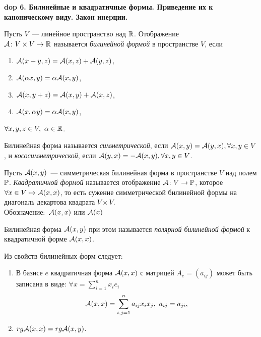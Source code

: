 \textbf{\LARGE dop 6. Билинейные и квадpатичные фоpмы. Пpиведение их к каноническому виду. Закон инеpции.}


\begin{definition}
Пусть $V$~--- линейное пространство над ${\mathbb{R}}$. Отображение\\ ${\mathcal{A}}\colon V\times V\to {\mathbb{R}}$ называется \emph{билинейной формой} в пространстве $V$, если
\begin{enumerate}
    \item ${\mathcal{A}}(x+y,z)={\mathcal{A}}(x,z)+{\mathcal{A}}(y,z)$,
    \item ${\mathcal{A}}(\alpha x,y)=\alpha{\mathcal{A}}(x,y)$,
    \item ${\mathcal{A}}(x,y+z)={\mathcal{A}}(x,y)+{\mathcal{A}}(x,z)$,
    \item ${\mathcal{A}}(x,\alpha y)=\alpha{\mathcal{A}}(x,y)$,
\end{enumerate}
$\forall x,y,z\in V,~\alpha\in{\mathbb{R}}$.
\end{definition}

\begin{definition}
Билинейная форма называется \emph{симметрической}, если ${\mathcal{A}}(x,y)={\mathcal{A}}(y,x),\forall x,y\in V$, и \emph{кососимметрической}, если ${\mathcal{A}}(y,x)=-{\mathcal{A}}(x,y),\forall x,y\in V$.
\end{definition}

\begin{definition}
Пусть ${\mathcal{A}}(x,y)$~--- симметрическая билинейная форма в пространстве $V$ над полем ${\mathbb{P}}$. \emph{Квадратичной формой} называется отображение ${\mathcal{A}}\colon V\to{\mathbb{P}}$, которое $\forall x\in V\mapsto {\mathcal{A}}(x,x)$, то есть сужение симметрической билинейной формы на диагональ декартова квадрата $V\times V$.\\
\textsf{Обозначение:}~${\mathcal{A}}(x,x)$ или ${\mathcal{A}}(x)$
\end{definition}

\begin{definition}
Билинейная форма ${\mathcal{A}}(x,y)$ при этом называется \emph{полярной билинейной формой} к квадратичной форме ${\mathcal{A}}(x,x)$.
\end{definition}

\begin{Commentwhite}
Из свойств билинейных форм следует:
\begin{enumerate}
    \item В базисе $e$ квадратичная форма ${\mathcal{A}}(x,x)$ с матрицей $A_e=(a_{ij})$ может быть записана в виде: $\forall x=\sum_{i=1}^nx_ie_i$
    \begin{equation}
    \label{eq общий вид кв. формы}
        {\mathcal{A}}(x,x)=\sum_{i,j=1}^na_{ij}x_ix_j,~a_{ij}=a_{ji},
    \end{equation}
    \item $rg{\mathcal{A}}(x,x)=rg{\mathcal{A}}(x,y)$.
\end{enumerate}
\end{Commentwhite}

